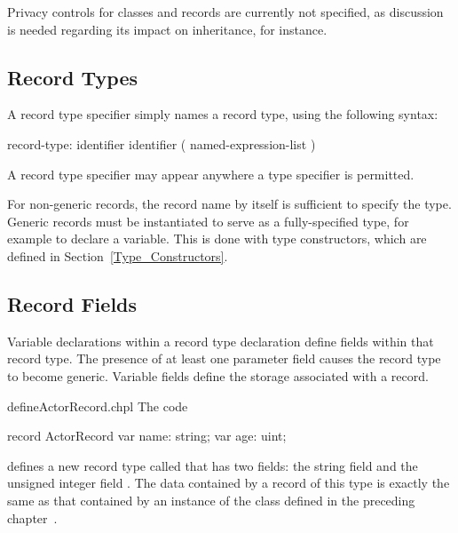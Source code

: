 \begin{future}
Privacy controls for classes and records are currently not specified,
as discussion is needed regarding its impact on inheritance, for
instance.
\end{future}

\subsection{Record Types}
\label{Record_Types}

A record type specifier simply names a record type, using
the following syntax:
\begin{syntax}
record-type:
  identifier
  identifier ( named-expression-list )
\end{syntax}
A record type specifier may appear anywhere a type specifier is permitted.

For non-generic records, the record name by itself is sufficient to specify the
type.  Generic records must be instantiated to serve as a fully-specified
type, for example to declare a variable.  This is done with
type constructors, which are defined in Section~\ref{Type_Constructors}.

\subsection{Record Fields}
\label{Record_Fields}

Variable declarations within a record type declaration define fields within that
record type.  The presence of at least one parameter field causes the record
type to become generic.  Variable fields define the storage associated with a
record.

\begin{chapelexample}{defineActorRecord.chpl}
The code
\begin{chapel}
record ActorRecord {
  var name: string;
  var age: uint;
}
\end{chapel}
\begin{chapeloutput}
\end{chapeloutput}
defines a new record type called  that has two fields: the
string field  and the unsigned integer field .  The data
contained by a record of this type is exactly the same as that contained by
an instance of the  class defined in the preceding chapter~.
\end{chapelexample}

